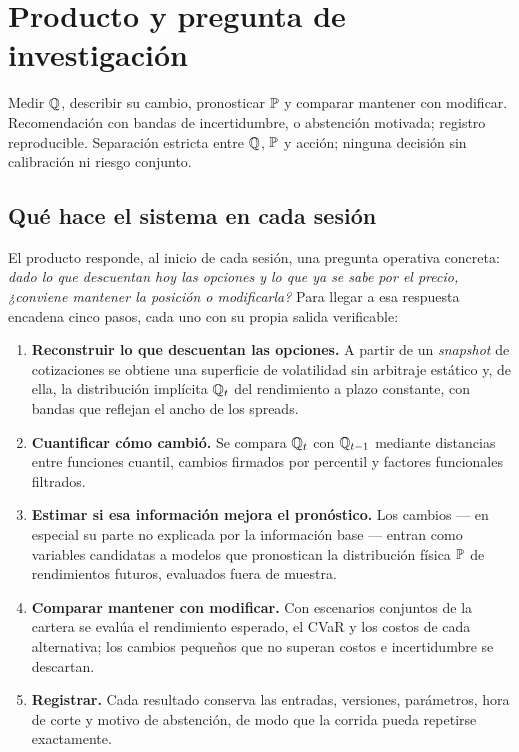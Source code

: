 \clearpage
\section{Producto y pregunta de investigación}\label{sec:producto}

{Medir $\Q$, describir su cambio, pronosticar $\P$ y comparar mantener con modificar.}
{Recomendación con bandas de incertidumbre, o abstención motivada; registro reproducible.}
{Separación estricta entre $\Q$, $\P$ y acción; ninguna decisión sin calibración ni riesgo conjunto.}

\subsection{Qué hace el sistema en cada sesión}

El producto responde, al inicio de cada sesión, una pregunta operativa concreta: \emph{dado lo que
descuentan hoy las opciones y lo que ya se sabe por el precio, ¿conviene mantener la posición o
modificarla?} Para llegar a esa respuesta encadena cinco pasos, cada uno con su propia salida
verificable:

\begin{enumerate}
\item \textbf{Reconstruir lo que descuentan las opciones.} A partir de un \emph{snapshot} de
cotizaciones se obtiene una superficie de volatilidad sin arbitraje estático y, de ella, la
distribución implícita $\Q_t$ del rendimiento a plazo constante, con bandas que reflejan el ancho de
los spreads.
\item \textbf{Cuantificar cómo cambió.} Se compara $\Q_t$ con $\Q_{t-1}$ mediante distancias entre
funciones cuantil, cambios firmados por percentil y factores funcionales filtrados.
\item \textbf{Estimar si esa información mejora el pronóstico.} Los cambios --- en especial su parte
no explicada por la información base --- entran como variables candidatas a modelos que pronostican la
distribución física $\P$ de rendimientos futuros, evaluados fuera de muestra.
\item \textbf{Comparar mantener con modificar.} Con escenarios conjuntos de la cartera se evalúa el
rendimiento esperado, el CVaR y los costos de cada alternativa; los cambios pequeños que no superan
costos e incertidumbre se descartan.
\item \textbf{Registrar.} Cada resultado conserva las entradas, versiones, parámetros, hora de corte y
motivo de abstención, de modo que la corrida pueda repetirse exactamente.
\end{enumerate}

